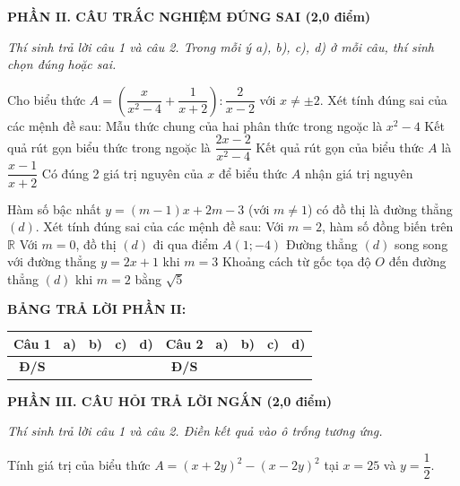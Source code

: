 \documentclass[12pt,a4paper]{article}
\begin{document}
\setcounter{ex}{0}
\noindent\textbf{\large PHẦN II. CÂU TRẮC NGHIỆM ĐÚNG SAI (2,0 điểm)}

\textit{Thí sinh trả lời câu 1 và câu 2. Trong mỗi ý a), b), c), d) ở mỗi câu, thí sinh chọn đúng hoặc sai.}

\vspace{1mm}
\begin{ex}
Cho biểu thức $A = \left(\dfrac{x}{x^2 - 4} + \dfrac{1}{x + 2}\right) : \dfrac{2}{x - 2}$ với $x \neq \pm 2$. Xét tính đúng sai của các mệnh đề sau:
\choiceTF
{\True Mẫu thức chung của hai phân thức trong ngoặc là $x^2 - 4$}
{\True Kết quả rút gọn biểu thức trong ngoặc là $\dfrac{2x - 2}{x^2 - 4}$}
{\True Kết quả rút gọn của biểu thức $A$ là $\dfrac{x - 1}{x + 2}$}
{Có đúng 2 giá trị nguyên của $x$ để biểu thức $A$ nhận giá trị nguyên}
\end{ex}

\begin{ex}
Hàm số bậc nhất $y = (m - 1)x + 2m - 3$ (với $m \neq 1$) có đồ thị là đường thẳng $(d)$. Xét tính đúng sai của các mệnh đề sau:
\choiceTF
{\True Với $m = 2$, hàm số đồng biến trên $\mathbb{R}$}
{\True Với $m = 0$, đồ thị $(d)$ đi qua điểm $A(1; -4)$}
{\True Đường thẳng $(d)$ song song với đường thẳng $y = 2x + 1$ khi $m = 3$}
{Khoảng cách từ gốc tọa độ $O$ đến đường thẳng $(d)$ khi $m = 2$ bằng $\sqrt{5}$}
\end{ex}


\noindent\textbf{BẢNG TRẢ LỜI PHẦN II:}
\begin{center}
\begin{tabular}{|c|c|c|c|c||c|c|c|c|c|}
\hline
\textbf{Câu 1} & \textbf{a)} & \textbf{b)} & \textbf{c)} & \textbf{d)} & \textbf{Câu 2} & \textbf{a)} & \textbf{b)} & \textbf{c)} & \textbf{d)} \\
\hline
\textbf{Đ/S} & \rule{0pt}{0.6cm} & & & & \textbf{Đ/S} & & & & \\
\hline
\end{tabular}
\end{center}
\vspace{2mm}

\setcounter{ex}{0}
\noindent\textbf{\large PHẦN III. CÂU HỎI TRẢ LỜI NGẮN (2,0 điểm)}

\textit{Thí sinh trả lời câu 1 và câu 2. Điền kết quả vào ô trống tương ứng.}

\vspace{1mm}
\begin{ex}
Tính giá trị của biểu thức $A = (x + 2y)^2 - (x - 2y)^2$ tại $x = 25$ và $y = \dfrac{1}{2}$. 
\end{ex}
\end{document}

